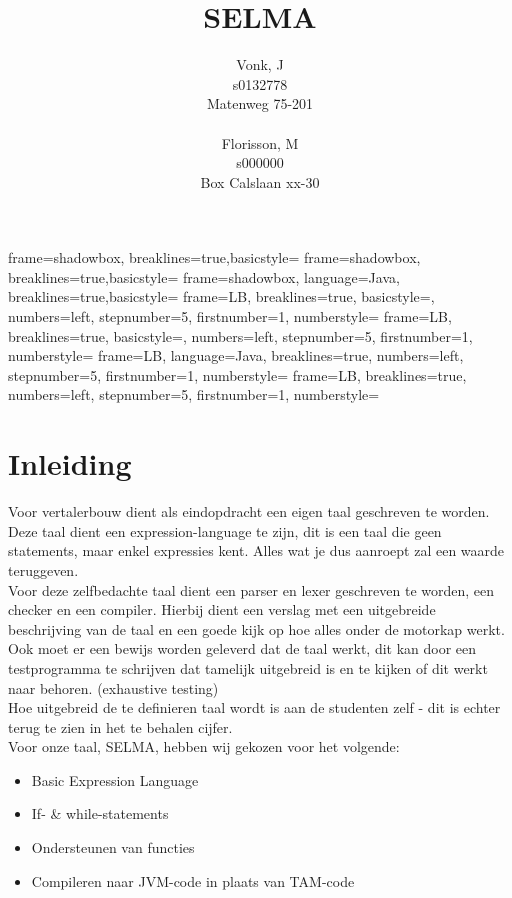 \documentclass[]{article}
\title{SELMA}
\author{ 
Vonk, J\\
s0132778\\
Matenweg 75-201\\
\\
Florisson, M\\
s000000\\
Box Calslaan xx-30}
\begin{document}
	{frame=shadowbox, breaklines=true,basicstyle=\footnotesize}
	{frame=shadowbox, breaklines=true,basicstyle=\small}
	{frame=shadowbox, language=Java, breaklines=true,basicstyle=\footnotesize}
	{frame=LB, breaklines=true, basicstyle=\scriptsize, numbers=left, stepnumber=5, firstnumber=1, numberstyle=\tiny}	
	{frame=LB, breaklines=true, basicstyle=\scriptsize, numbers=left, stepnumber=5, firstnumber=1, numberstyle=\tiny}	
	{frame=LB, language=Java, breaklines=true, numbers=left, stepnumber=5, firstnumber=1, numberstyle=\tiny}	
	{frame=LB, breaklines=true, numbers=left, stepnumber=5, firstnumber=1, numberstyle=\tiny}	

\newcommand{\todo}[1]{\marginpar{\fcolorbox{red}{yellow}{\textbf{#1}}}}



\begin{titlepage}
\maketitle 
\end{titlepage}
\tableofcontents{}

\newpage
\section{Inleiding}
Voor vertalerbouw dient als eindopdracht een eigen taal geschreven te worden. Deze taal dient een expression-language te zijn, dit is een taal die geen statements, maar enkel expressies kent. Alles wat je dus aanroept zal een waarde teruggeven.\\
Voor deze zelfbedachte taal dient een parser en lexer geschreven te worden, een checker en een compiler. Hierbij dient een verslag met een uitgebreide beschrijving van de taal en een goede kijk op hoe alles onder de motorkap werkt. Ook moet er een bewijs worden geleverd dat de taal werkt, dit kan door een testprogramma te schrijven dat tamelijk uitgebreid is en te kijken of dit werkt naar behoren. (exhaustive testing) \\
Hoe uitgebreid de te definieren taal wordt is aan de studenten zelf - dit is echter terug te zien in het te behalen cijfer.\\
Voor onze taal, SELMA, hebben wij gekozen voor het volgende:
\todo{Klopt?}
\begin{itemize}
\item Basic Expression Language
\item If- \& while-statements
\item Ondersteunen van functies
\item Compileren naar JVM-code in plaats van TAM-code
\end{itemize}
\end{document}
